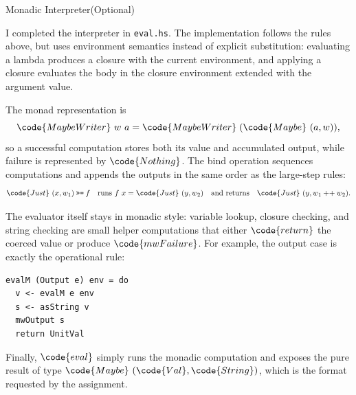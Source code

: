 \documentclass{article}
\begin{document}
%
%
%


\newpage

\begin{question}{Monadic Interpreter}{(Optional)}

I completed the interpreter in \texttt{eval.hs}. The implementation follows
the rules above, but uses environment semantics instead of explicit
substitution: evaluating a lambda produces a closure with the current
environment, and applying a closure evaluates the body in the closure
environment extended with the argument value.

The monad representation is
\[
  \code{MaybeWriter}\ w\ a
  =
  \code{MaybeWriter}\;(\code{Maybe}\ (a,w)),
\]
so a successful computation stores both its value and accumulated output,
while failure is represented by \(\code{Nothing}\). The bind operation
sequences computations and appends the outputs in the same order as the
large-step rules:
\[
  \code{Just}\ (x,w_1) \bindop f
  \quad\text{runs } f~x=\code{Just}\ (y,w_2)
  \quad\text{and returns}\quad
  \code{Just}\ (y,w_1\sappend w_2).
\]

The evaluator itself stays in monadic style: variable lookup, closure
checking, and string checking are small helper computations that either
\(\code{return}\) the coerced value or produce \(\code{mwFailure}\). For
example, the output case is exactly the operational rule:
\begin{verbatim}
evalM (Output e) env = do
  v <- evalM e env
  s <- asString v
  mwOutput s
  return UnitVal
\end{verbatim}
Finally, \(\code{eval}\) simply runs the monadic computation and exposes the
pure result of type \(\code{Maybe}\ (\code{Val},\code{String})\), which is the
format requested by the assignment.

\end{question}
\end{document}
